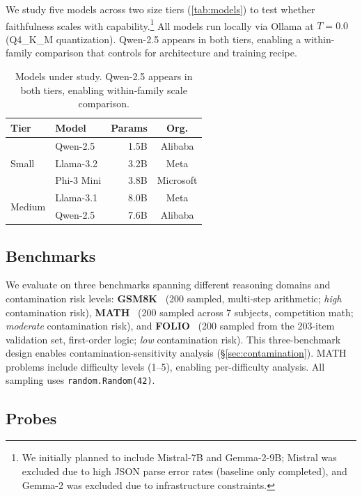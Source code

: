 \documentclass[11pt]{article}
\begin{document}
We study five models across two size tiers (\autoref{tab:models}) to test whether faithfulness scales with capability.\footnote{We initially planned to include Mistral-7B and Gemma-2-9B; Mistral was excluded due to high JSON parse error rates (baseline only completed), and Gemma-2 was excluded due to infrastructure constraints.} All models run locally via Ollama at $T{=}0.0$ (Q4\_K\_M quantization). Qwen-2.5 appears in both tiers, enabling a within-family comparison that controls for architecture and training recipe.

\begin{table}[t]
\centering\small
\begin{tabular}{llrc}
\toprule
\textbf{Tier} & \textbf{Model} & \textbf{Params} & \textbf{Org.} \\
\midrule
\multirow{3}{*}{Small} & Qwen-2.5 & 1.5B & Alibaba \\
 & Llama-3.2 & 3.2B & Meta \\
 & Phi-3 Mini & 3.8B & Microsoft \\
\midrule
\multirow{2}{*}{Medium} & Llama-3.1 & 8.0B & Meta \\
 & Qwen-2.5 & 7.6B & Alibaba \\
\bottomrule
\end{tabular}
\caption{Models under study. Qwen-2.5 appears in both tiers, enabling within-family scale comparison.}
\label{tab:models}
\end{table}

\subsection{Benchmarks}

We evaluate on three benchmarks spanning different reasoning domains and contamination risk levels: \textbf{GSM8K}~\cite{cobbe2021gsm8k} (200 sampled, multi-step arithmetic; \emph{high} contamination risk), \textbf{MATH}~\cite{hendrycks2021math} (200 sampled across 7 subjects, competition math; \emph{moderate} contamination risk), and \textbf{FOLIO}~\cite{han2022folio} (200 sampled from the 203-item validation set, first-order logic; \emph{low} contamination risk). This three-benchmark design enables contamination-sensitivity analysis (\S\ref{sec:contamination}). MATH problems include difficulty levels (1--5), enabling per-difficulty analysis. All sampling uses \texttt{random.Random(42)}.

\subsection{Probes}
\end{document}
